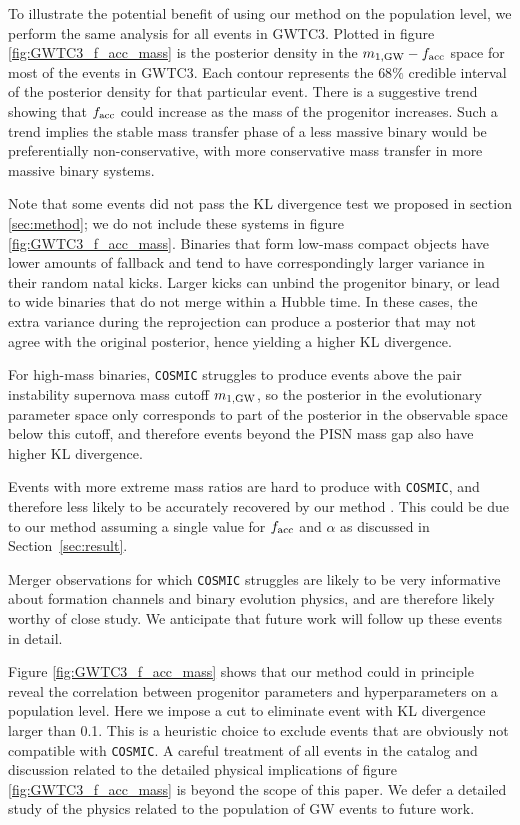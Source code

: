 \documentclass[twocolumn]{aastex631}
\begin{document}
To illustrate the potential benefit of using our method on the population level, we
perform the same analysis for all events in GWTC3. Plotted in figure
\ref{fig:GWTC3_f_acc_mass} is the posterior density in the $m_{1,{\rm
GW}}-f_{\rm acc}$ space for most of the events in GWTC3. Each contour represents
the $68\%$ credible interval of the posterior density for that particular event.
There is a suggestive trend showing that $f_{\rm acc}$ could increase as the mass of
the progenitor increases. Such a trend implies the stable mass transfer
phase of a less massive binary would be preferentially non-conservative, with
more conservative mass transfer in more massive binary systems.

Note that some events did not pass the KL divergence test we proposed in section
\ref{sec:method}; we do not include these systems in figure
\ref{fig:GWTC3_f_acc_mass}. Binaries that form low-mass compact objects have
lower amounts of fallback and tend to have correspondingly larger variance in
their random natal kicks. Larger kicks can unbind the progenitor binary, or lead
to wide binaries that do not merge within a Hubble time.  In these cases, the
extra variance during the reprojection can produce a posterior that may not
agree with the original posterior, hence yielding a higher KL divergence.

For high-mass binaries, \texttt{COSMIC} struggles to produce events above the
pair instability supernova mass cutoff $m_{1,{\rm GW}}$, so the posterior in the
evolutionary parameter space only corresponds to part of the posterior in the
observable space below this cutoff, and therefore events beyond the PISN mass
gap also have higher KL divergence.

Events with more extreme mass ratios are hard to produce with \texttt{COSMIC},
and therefore less likely to be accurately recovered by our method \citep[e.g.][]{Zevin2020}. This could
be due to our method assuming a single value for $f_{\rm acc}$ and $\alpha$ as
discussed in Section~\ref{sec:result}.

Merger observations for which \texttt{COSMIC} struggles are likely to be very
informative about formation channels and binary evolution physics, and are
therefore likely worthy of close study.  We anticipate that future work will
follow up these events in detail.

Figure \ref{fig:GWTC3_f_acc_mass} shows that our method could in principle
reveal the correlation between progenitor parameters and hyperparameters on a
population level. Here we impose a cut to eliminate event with KL divergence larger
than 0.1.
This is a heuristic choice to exclude events that are obviously not compatible with
\texttt{COSMIC}.
A careful treatment of all events in the catalog and
discussion related to the detailed physical implications of figure
\ref{fig:GWTC3_f_acc_mass} is beyond the scope of this paper.  We defer a
detailed study of the physics related to the population of GW events to future
work.
\end{document}
